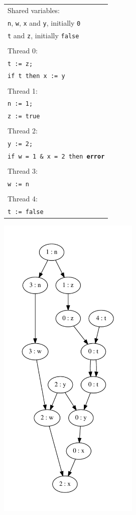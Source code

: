 \documentclass[12pt,a4paper,twoside,openright]{report}
\begin{document}
\begin{figure}
	\centering
	\begin{subfigure}{0.5\textwidth}
		\centering
		\begin{tabular}{l}
			Shared variables: \\
			\qquad \texttt{n}, \texttt{w},
			\texttt{x} and \texttt{y},
			initially \texttt{0} \\
			\qquad \texttt{t} and \texttt{z},
			initially \texttt{false} \\
			\\
			Thread 0: \\
			\qquad \texttt{t := z;} \\
			\qquad \texttt{if t then x := y} \\
			\\
			Thread 1: \\
			\qquad \texttt{n := 1;} \\
			\qquad \texttt{z := true} \\
			\\
			Thread 2: \\
			\qquad \texttt{y := 2;} \\
			\qquad \texttt{if w = 1 \& x = 2 then \textbf{error}} \\
			\\
			Thread 3: \\
			\qquad \texttt{w := n} \\
			\\
			Thread 4: \\
			\qquad \texttt{t := false} \\
		\end{tabular}
	\end{subfigure}%
	\begin{subfigure}{0.5\textwidth}
		\centering
		\includegraphics[height=15cm]{error_trace}

\end{subfigure}
\end{figure}
\end{document}
